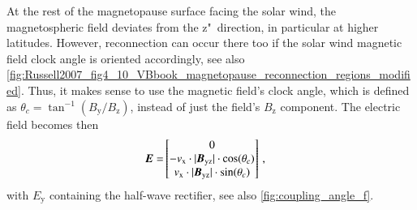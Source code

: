 At the rest of the magnetopause surface facing the solar wind, the magnetospheric field deviates from the z"~direction, in particular at higher latitudes. However, reconnection can occur there too if the solar wind magnetic field clock angle is oriented accordingly, see also \autoref{fig:Russell2007_fig4_10_VBbook_magnetopause_reconnection_regions_modified}. Thus, it makes sense to use the magnetic field's clock angle, which is defined as $\theta_c = \tan^{-1}\left(B_\text{y} / B_\text{z}\right)$, instead of just the field's $B_\text{z}$ component. The electric field becomes then
\begin{align}
	\boldsymbol{E} =& \begin{bmatrix}
		0\\
		- v_\text{x} \cdot |\boldsymbol{B_\text{yz}}| \cdot \cos(\theta_c)\\
		v_\text{x} \cdot |\boldsymbol{B_\text{yz}}| \cdot \sin(\theta_c)\\
	\end{bmatrix}	\,,
\end{align}
with $E_\text{y}$ containing the half-wave rectifier, see also \autoref{fig:coupling_angle_f}.




